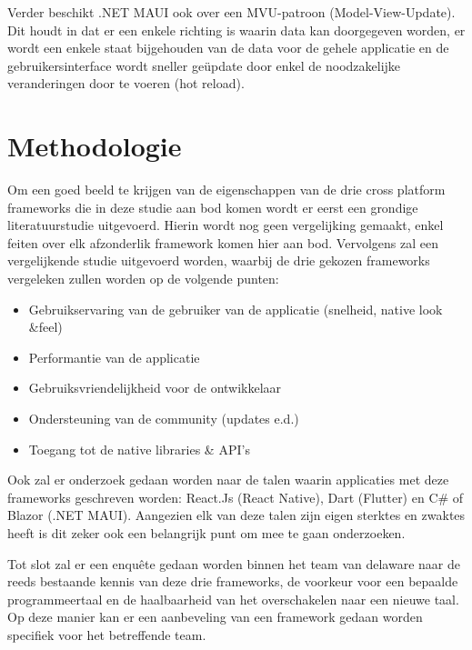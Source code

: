 Verder beschikt .NET MAUI ook over een MVU-patroon (Model-View-Update). Dit houdt in dat er een enkele richting is waarin data kan doorgegeven worden, er wordt een enkele staat bijgehouden van de data voor de gehele applicatie en de gebruikersinterface wordt sneller geüpdate door enkel de noodzakelijke veranderingen door te voeren (hot reload).


\section{Methodologie}
\label{sec:methodologie}

Om een goed beeld te krijgen van de eigenschappen van de drie cross platform frameworks die in deze studie aan bod komen wordt er eerst een grondige literatuurstudie uitgevoerd. Hierin wordt nog geen vergelijking gemaakt, enkel feiten over elk afzonderlik framework komen hier aan bod. Vervolgens zal een vergelijkende studie uitgevoerd worden, waarbij de drie gekozen frameworks vergeleken zullen worden op de volgende punten: 

\begin{itemize}
    \item Gebruikservaring van de gebruiker van de applicatie (snelheid, native look \&feel)
    \item Performantie van de applicatie
    \item Gebruiksvriendelijkheid voor de ontwikkelaar
    \item Ondersteuning van de community (updates e.d.)
    \item Toegang tot de native libraries \& API's
\end{itemize}

Ook zal er onderzoek gedaan worden naar de talen waarin applicaties met deze frameworks geschreven worden: React.Js (React Native), Dart (Flutter) en C\# of Blazor (.NET MAUI). Aangezien elk van deze talen zijn eigen sterktes en zwaktes heeft is dit zeker ook een belangrijk punt om mee te gaan onderzoeken. 

Tot slot zal er een enquête gedaan worden binnen het team van delaware naar de reeds bestaande kennis van deze drie frameworks, de voorkeur voor een bepaalde programmeertaal en de haalbaarheid van het overschakelen naar een nieuwe taal. Op deze manier kan er een aanbeveling van een framework gedaan worden specifiek voor het betreffende team.


